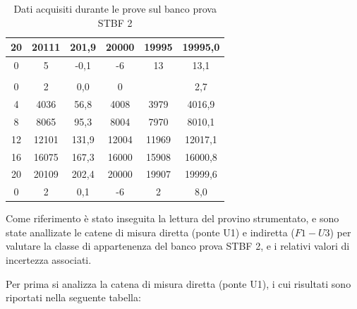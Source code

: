 \documentclass[a4paper, twoside]{article}
\begin{document}
\begin{table}[H]
{\begin{tabular}{|c|c|c|c|c|c|}
        \hline
        20 & 20111 & 201,9 & 20000 & 19995 & 19995,0 \\
        \hline
        0 & 5 & -0,1 & -6 & 13 & 13,1 \\
        \hline
        \rowcolor{rowlight}
        \multicolumn{6}{|c|}{\textbf{Terza serie}} \\
        \hline
        0 & 2 & 0,0 & 0 & & 2,7 \\
        \hline
        4 & 4036 & 56,8 & 4008 & 3979 & 4016,9 \\
        \hline
        8 & 8065 & 95,3 & 8004 & 7970 & 8010,1 \\
        \hline
        12 & 12101 & 131,9 & 12004 & 11969 & 12017,1 \\
        \hline
        16 & 16075 & 167,3 & 16000 & 15908 & 16000,8 \\
        \hline
        20 & 20109 & 202,4 & 20000 & 19907 & 19999,6 \\
        \hline
        0 & 2 & 0,1 & -6 & 2 & 8,0 \\
        \hline
    \end{tabular}%
    }
    \caption{Dati acquisiti durante le prove sul banco prova STBF 2}
    \label{tab:dati_prova_stbf2}
\end{table}

Come riferimento è stato inseguita la lettura del provino strumentato, e sono state anallizate le catene di misura diretta (ponte U1) e indiretta ($F1-U3$) per valutare la classe di appartenenza del banco prova STBF 2, e i relativi valori di incertezza associati.

Per prima si analizza la catena di misura diretta (ponte U1), i cui risultati sono riportati nella seguente tabella:
\end{document}
